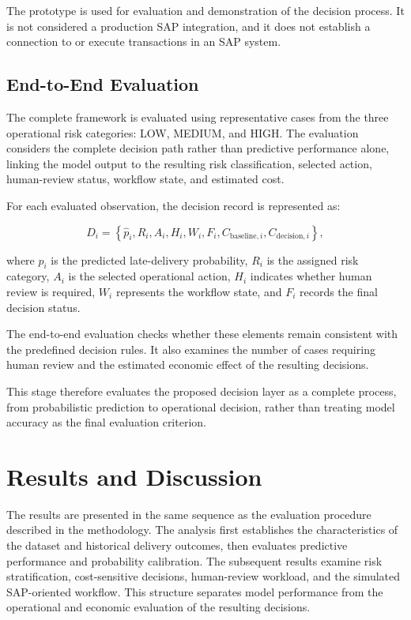 \documentclass[manuscript, screen, review]{acmart}
\begin{document}
The prototype is used for evaluation and demonstration of the
decision process. It is not considered a production SAP integration,
and it does not establish a connection to or execute transactions in
an SAP system.

\subsection{End-to-End Evaluation}

The complete framework is evaluated using representative cases from
the three operational risk categories: LOW, MEDIUM, and HIGH. The
evaluation considers the complete decision path rather than predictive
performance alone, linking the model output to the resulting risk
classification, selected action, human-review status, workflow state,
and estimated cost.

For each evaluated observation, the decision record is represented as:

\begin{equation}
D_i =
\left\{
\hat{p}_i,
R_i,
A_i,
H_i,
W_i,
F_i,
C_{\mathrm{baseline},i},
C_{\mathrm{decision},i}
\right\},
\label{eq:decision_record}
\end{equation}

where $\hat{p}_i$ is the predicted late-delivery probability, $R_i$
is the assigned risk category, $A_i$ is the selected operational
action, $H_i$ indicates whether human review is required, $W_i$
represents the workflow state, and $F_i$ records the final decision
status.

The end-to-end evaluation checks whether these elements remain
consistent with the predefined decision rules. It also examines the
number of cases requiring human review and the estimated economic
effect of the resulting decisions.

This stage therefore evaluates the proposed decision layer as a
complete process, from probabilistic prediction to operational
decision, rather than treating model accuracy as the final evaluation
criterion.

\section{Results and Discussion}
The results are presented in the same sequence as the evaluation
procedure described in the methodology. The analysis first establishes
the characteristics of the dataset and historical delivery outcomes,
then evaluates predictive performance and probability calibration.
The subsequent results examine risk stratification, cost-sensitive
decisions, human-review workload, and the simulated SAP-oriented
workflow. This structure separates model performance from the
operational and economic evaluation of the resulting decisions.
\end{document}
